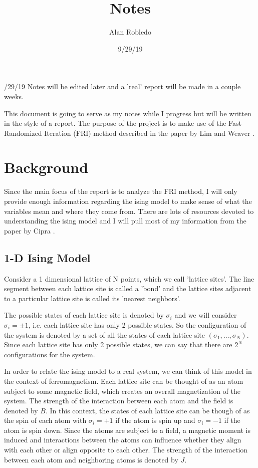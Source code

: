 \documentclass{article}
\title{Notes}
\date{9/29/19}
\author{Alan Robledo}
\begin{document}
/29/19 Notes will be edited later and a 'real' report will be made in a couple weeks.

This document is going to serve as my notes while I progress but will be written in the style of a report.
The purpose of the project is to make use of the Fast Randomized Iteration (FRI) method described in the paper by Lim and Weaver \cite{lim_weare}.
\section{Background}
Since the main focus of the report is to analyze the FRI method, I will only provide enough information regarding the ising model to make sense of what the variables mean and where they come from. There are lots of resources devoted to understanding the ising model and I will pull most of my information from the paper by Cipra \cite{cipra}.

\subsection{1-D Ising Model}
Consider a 1 dimensional lattice of N points, which we call 'lattice sites'.
The line segment between each lattice site is called a 'bond' and the lattice sites adjacent to a particular lattice site is called its 'nearest neighbors'.

The possible states of each lattice site is denoted by $\sigma_i$ and we will consider $\sigma_i = \pm 1$, i.e. each lattice site has only 2 possible states.
So the configuration of the system is denoted by a set of all the states of each lattice site $(\sigma_1, \dots, \sigma_N)$.
Since each lattice site has only 2 possible states, we can say that there are $2^N$ configurations for the system.

In order to relate the ising model to a real system, we can think of this model in the context of ferromagnetism.
Each lattice site can be thought of as an atom subject to some magnetic field, which creates an overall magnetization of the system.
The strength of the interaction between each atom and the field is denoted by $B$.
In this context, the states of each lattice site can be though of as the spin of each atom with $\sigma_i = +1$ if the atom is spin up and $\sigma_i = -1$ if the atom is spin down.
Since the atoms are subject to a field, a magnetic moment is induced and interactions between the atoms can influence whether they align with each other or align opposite to each other.
The strength of the interaction between each atom and neighboring atoms is denoted by $J$.
\end{document}
